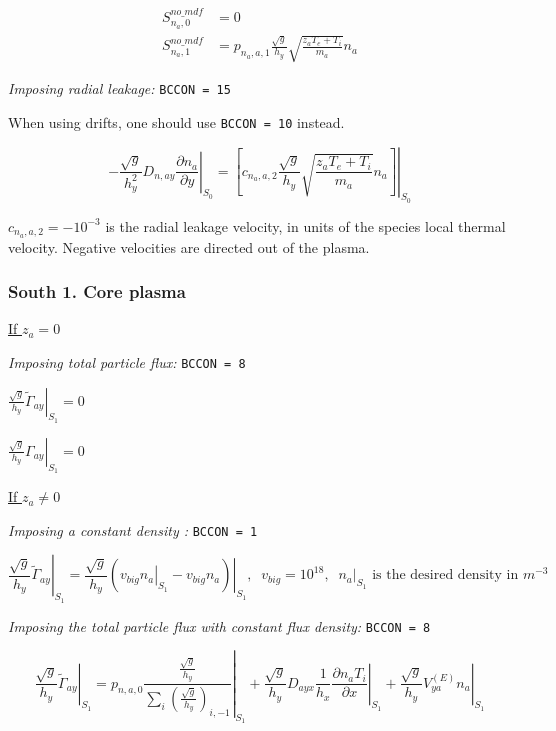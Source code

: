 \documentclass[a4paper,10pt]{report}
\begin{document}
\begin{align}
S^{no\_mdf}_{n_a,0} & = 0 \\
S^{no\_mdf}_{n_a,1} & = {p_{n_a,a,1}} \frac{\sqrt{g}}{h_y} \sqrt{\frac{z_a T_e + T_i}{m_a}} n_a
\end{align}

{\em Imposing radial leakage:} {\tt BCCON = 15}

When using drifts, one should use {\tt BCCON = 10} instead.

\begin{equation}
\left. -\frac{\sqrt g}{h_y^2} D_{n,ay} \frac{\partial n_a}{\partial y} \right|_{S_0}
=
\left. \left[
c_{n_a,a,2} \frac{\sqrt g}{h_y} \sqrt{\frac{z_a T_e + T_i}{m_a}} n_a
\right] \right|_{S_0}
\end{equation}

$c_{n_a,a,2} = -10^{-3}$ is the radial leakage velocity, in units of the species local thermal velocity. Negative velocities are directed out of the plasma.


\subsubsection{South 1. Core plasma}

\underline{If $z_a = 0$}


{\em Imposing total particle flux:} {\tt BCCON = 8}

$\left. \frac{\sqrt g}{h_y} \widetilde{\Gamma}_{ay} \right|_{S_1} = 0$

$\left. \frac{\sqrt g}{h_y} \Gamma_{ay} \right|_{S_1} = 0$

\underline{If $z_a \neq 0$}

{\em Imposing a constant density :} {\tt BCCON = 1}

\begin{equation}
\left. \frac{\sqrt g}{h_y} \widetilde{\Gamma}_{ay} \right|_{S_1}
=
\frac{\sqrt{g}}{h_y}
\left. \left(
	\left. v_{big} n_a \right|_{S_1} - v_{big} n_a
\right) \right|_{S_1},
\;\;
v_{big} = 10^{18},
\;\;
\left. n_a \right|_{S_1} \text{ is the desired density in } m^{-3}
\end{equation}

{\em Imposing the total particle flux with constant flux density:} {\tt BCCON = 8}

\begin{equation*}
\left. \frac{\sqrt g}{h_y} \widetilde{\Gamma}_{ay} \right|_{S_1} =
\left. p_{n,a,0} \frac{
\frac{\sqrt g}{h_y}
} {
\sum \limits_i \left(
	\frac{\sqrt g}{h_y}
\right)_{i, -1}
} \right|_{S_1}
+
\left.
\frac{\sqrt g}{h_y} D_{ayx} \frac 1{h_x} \frac{\partial n_a T_i}{\partial x}
\right|_{S_1} +
\left. \frac{\sqrt g}{h_y}V_{ya}^{(E)} n_a \right|_{S_1}
\end{equation*}
\end{document}
